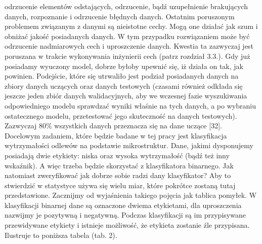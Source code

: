 odrzucenie elementów odstających,
odrzucenie, bądź uzupełnienie brakujących danych,
rozpoznanie i odrzucenie błędnych danych.
Ostatnim poruszonym problemem związanym z danymi są nieistotne cechy. Mogą one działać jak szum i obniżać jakość posiadanych danych. W tym przypadku rozwiązaniem może być odrzucenie nadmiarowych cech i uproszczenie danych. Kwestia ta zazwyczaj jest poruszana w trakcie wykonywania inżynierii cech (patrz rozdział 3.3.).
Gdy już posiadamy wyuczony model, dobrze byłoby upewnić się, iż działa on tak, jak powinien. Podejście, które się utrwaliło jest podział posiadanych danych na zbiory danych uczących oraz danych testowych (czasami również odkłada się jeszcze jeden zbiór danych walidacyjnych, aby we wczesnej fazie wyszukiwania odpowiedniego modelu sprawdzać wyniki właśnie na tych danych, a po wybraniu ostatecznego modelu, przetestować jego skuteczność na danych testowych). Zazwyczaj 80\% wszystkich danych przeznacza się na dane uczące [32].
Docelowym zadaniem, które będzie badane w tej pracy jest klasyfikacja wytrzymałości odlewów na podstawie mikrostruktur. Dane, jakimi dysponujemy posiadają dwie etykiety: niska oraz wysoka wytrzymałość (bądź też inny wskaźnik). A więc trzeba będzie skorzystać z klasyfikatora binarnego. Jak natomiast zweryfikować jak dobrze sobie radzi dany klasyfikator? Aby to stwierdzić w statystyce używa się wielu miar, które pokrótce zostaną tutaj przedstawione. Zacznijmy od wyjaśnienia takiego pojęcia jak tablica pomyłek. W klasyfikacji binarnej dane są oznaczone dwiema etykietami, dla uproszczenia nazwijmy je pozytywną i negatywną. Podczas klasyfikacji są im przypisywane przewidywane etykiety i istnieje możliwość, że etykieta zostanie źle przypisana. Ilustruje to poniższa tabela (tab. 2).

